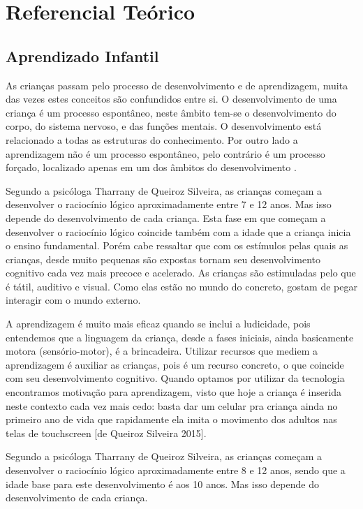 \chapter[Referencial Teórico]{Referencial Teórico}

\section{Aprendizado Infantil}

As crianças passam pelo processo de desenvolvimento e de aprendizagem, muita das vezes estes conceitos são confundidos entre si. O desenvolvimento de uma criança é um processo espontâneo, neste âmbito tem-se o desenvolvimento do corpo, do sistema nervoso, e das funções mentais. O desenvolvimento está relacionado a todas as estruturas do conhecimento. Por outro lado a aprendizagem não é um processo espontâneo, pelo contrário é um processo forçado, localizado apenas em um dos âmbitos do desenvolvimento \cite{piaget:1972}.

Segundo a psicóloga Tharrany de Queiroz Silveira, as crianças começam a desenvolver o raciocínio lógico aproximadamente entre 7 e 12 anos. Mas isso depende do desenvolvimento de cada criança. Esta fase em que começam a desenvolver o raciocínio lógico coincide também com a idade que a criança inicia o ensino fundamental. Porém cabe ressaltar que com os estímulos pelas quais as crianças, desde muito pequenas são expostas tornam seu desenvolvimento cognitivo cada vez mais precoce e acelerado. As crianças são estimuladas pelo que é tátil, auditivo e visual. Como elas estão no mundo do concreto, gostam de pegar interagir com o mundo externo.

A aprendizagem é muito mais eficaz quando se inclui a ludicidade, pois entendemos que a linguagem da criança, desde a fases iniciais, ainda basicamente motora (sensório-motor), é a brincadeira. Utilizar recursos que mediem a aprendizagem é auxiliar as crianças, pois é um recurso concreto, o que coincide com seu desenvolvimento cognitivo. Quando optamos por utilizar da tecnologia encontramos motivação para aprendizagem, visto que hoje a criança é inserida neste contexto cada vez mais cedo: basta dar um celular pra criança ainda no primeiro ano de vida que rapidamente ela imita o movimento dos adultos nas telas de touchscreen [de Queiroz Silveira 2015].

Segundo a psicóloga Tharrany de Queiroz Silveira, as crianças começam a desenvolver o raciocínio lógico aproximadamente entre 8 e 12 anos,  sendo que a idade base para este desenvolvimento é aos 10 anos. Mas isso depende do desenvolvimento de cada criança.

